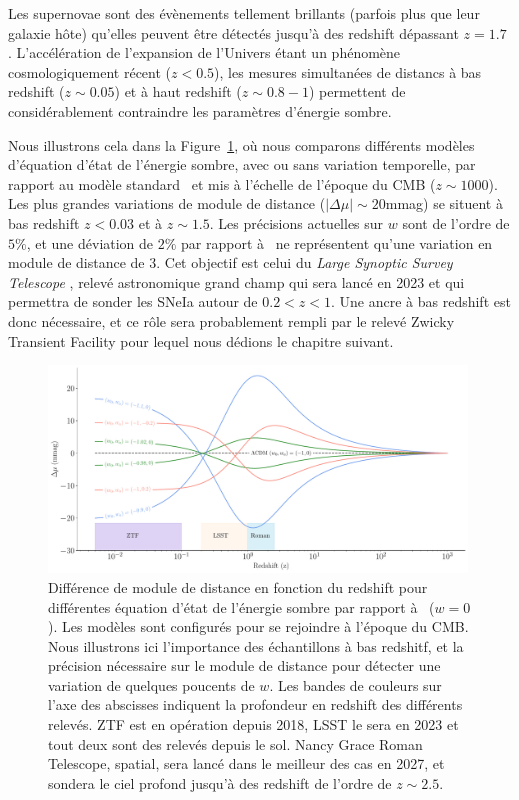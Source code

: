 \documentclass[../main/main.tex]{subfiles}
\begin{document}
Les supernovae sont des évènements tellement brillants (parfois plus que
leur galaxie hôte) qu'elles peuvent être détectés jusqu'à des redshift
dépassant $z=1.7$ \citep{Rubin2013, Jones2013}. L'accélération de
l'expansion de l'Univers étant un phénomène cosmologiquement récent
($z<0.5$), les mesures simultanées de distancs à bas redshift ($z\sim0.05$) et à
haut redshift ($z\sim0.8-1$) permettent de considérablement contraindre
les paramètres d'énergie sombre.

Nous illustrons cela dans la Figure~\ref{fig:evolv_DEstate}, où nous
comparons différents modèles d'équation d'état de l'énergie sombre, avec
ou sans variation temporelle, par rapport au modèle standard \lcdm\ et
mis à l'échelle de l'époque du CMB ($z\sim1000$). Les plus grandes
variations de module de distance ($\lvert\Delta\mu\rvert\sim20$mmag) se situent à bas
redshift $z<0.03$ et à $z\sim1.5$. Les précisions actuelles sur $w$ sont
de l'ordre de $5\%$, et une déviation de $2\%$ par rapport à \lcdm\ ne
représentent qu'une variation en module de distance de
$3$\textperthousand. Cet objectif est celui du \textit{Large Synoptic
  Survey Telescope} \citep[LSST;][]{LSSTbook2}, relevé
astronomique grand champ qui sera lancé en 2023 et qui permettra de
sonder les SNeIa autour de $0.2<z<1$. Une ancre à bas redshift est donc
nécessaire, et ce rôle sera probablement rempli par le relevé Zwicky
Transient Facility \citep[ZTF;][]{GrahamZTF2019,BellmZTF2019} pour
lequel nous dédions le chapitre suivant.

\begin{figure}[ht]
  \centering
  \includegraphics[width=0.99\textwidth]{../figures/01_cosmology/darkenergy_variation.pdf}
  \caption[Différence de module de distance en fonction du redshift pour
  différentes équation d'état de l'énergie sombre.]{Différence de module de distance en fonction du redshift pour
  différentes équation d'état de l'énergie sombre par rapport à \lcdm\
  ($w=0$). Les modèles sont configurés pour se rejoindre à l'époque du
  CMB. Nous illustrons ici l'importance des échantillons à bas redshitf,
et la précision nécessaire sur le module de distance pour détecter une
variation de quelques poucents de $w$. Les bandes de couleurs sur l'axe
des abscisses indiquent la profondeur en redshift des différents
relevés. ZTF est en opération depuis 2018, LSST le sera en 2023 et tout
deux sont des relevés depuis le sol. Nancy Grace Roman Telescope, spatial, sera
lancé dans le meilleur des cas en 2027, et sondera le ciel profond
jusqu'à des redshift de l'ordre de $z\sim2.5$.} 
  \label{fig:evolv_DEstate}
\end{figure}

%
%
\end{document}

